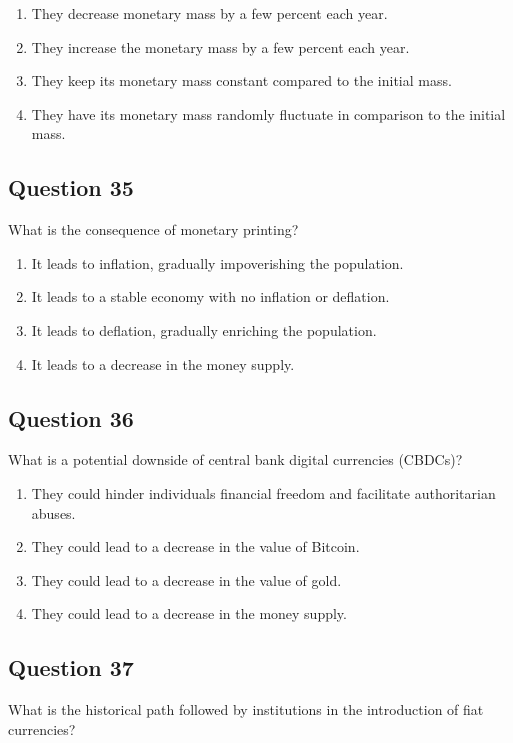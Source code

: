 \documentclass[12pt,a4paper]{article}
\begin{document}
\begin{enumerate}[label=\Alph*., leftmargin=*]
\item They decrease monetary mass by a few percent each year.
\item They increase the monetary mass by a few percent each year.
\item They keep its monetary mass constant compared to the initial mass.
\item They have its monetary mass randomly fluctuate in comparison to the initial mass.
\end{enumerate}

\bigskip


\subsection*{Question 35}
What is the consequence of monetary printing?

\begin{enumerate}[label=\Alph*., leftmargin=*]
\item It leads to inflation, gradually impoverishing the population.
\item It leads to a stable economy with no inflation or deflation.
\item It leads to deflation, gradually enriching the population.
\item It leads to a decrease in the money supply.
\end{enumerate}

\bigskip


\subsection*{Question 36}
What is a potential downside of central bank digital currencies (CBDCs)?

\begin{enumerate}[label=\Alph*., leftmargin=*]
\item They could hinder individuals financial freedom and facilitate authoritarian abuses.
\item They could lead to a decrease in the value of Bitcoin.
\item They could lead to a decrease in the value of gold.
\item They could lead to a decrease in the money supply.
\end{enumerate}

\bigskip


\subsection*{Question 37}
What is the historical path followed by institutions in the introduction of fiat currencies?
\end{document}
